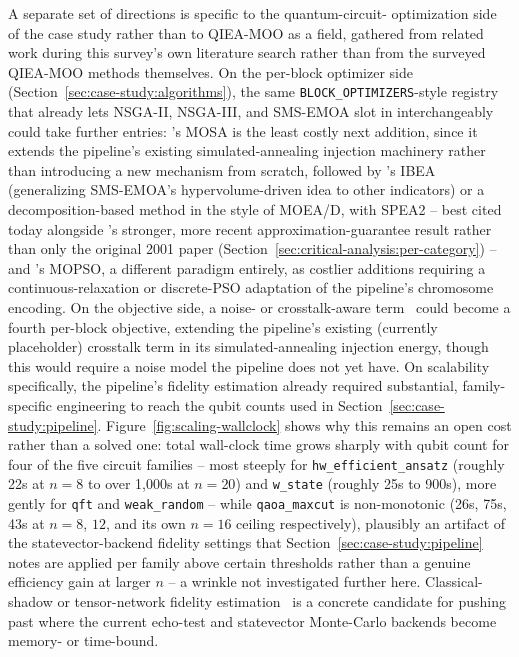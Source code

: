 A separate set of directions is specific to the quantum-circuit-
optimization side of the case study rather than to QIEA-MOO as a
field, gathered from related work during this survey's own literature
search rather than from the surveyed QIEA-MOO methods themselves.
On the per-block optimizer side
(Section~\ref{sec:case-study:algorithms}), the same
\texttt{BLOCK\_OPTIMIZERS}-style registry that already lets NSGA-II,
NSGA-III, and SMS-EMOA slot in interchangeably could take further
entries: \citet{ulungu1999mosa}'s MOSA is the least costly next
addition, since it extends the pipeline's existing simulated-annealing
injection machinery rather than introducing a new mechanism from
scratch, followed by \citet{zitzler2004ibea}'s IBEA (generalizing
SMS-EMOA's hypervolume-driven idea to other indicators) or a
decomposition-based method in the style of MOEA/D, with SPEA2 -- best
cited today alongside \citet{alghouass2025spea2beatsnsga2}'s stronger,
more recent approximation-guarantee result rather than only the
original 2001 paper (Section~\ref{sec:critical-analysis:per-category})
-- and \citet{coello2002mopso}'s MOPSO, a different paradigm entirely,
as costlier additions requiring a continuous-relaxation or discrete-PSO
adaptation of the pipeline's chromosome encoding. On the objective
side, a noise- or crosstalk-aware term~\citep{hua2022crosstalk} could
become a fourth per-block objective, extending the pipeline's existing
(currently placeholder) crosstalk term in its simulated-annealing
injection energy, though this would require a noise model the pipeline
does not yet have. On scalability specifically, the pipeline's fidelity
estimation already required substantial, family-specific engineering to
reach the qubit counts used in Section~\ref{sec:case-study:pipeline}.
Figure~\ref{fig:scaling-wallclock} shows why this remains an open cost
rather than a solved one: total wall-clock time grows sharply with
qubit count for four of the five circuit families -- most steeply for
\texttt{hw\_efficient\_ansatz} (roughly 22s at $n{=}8$ to over 1{,}000s
at $n{=}20$) and \texttt{w\_state} (roughly 25s to 900s), more gently
for \texttt{qft} and \texttt{weak\_random} --
while \texttt{qaoa\_maxcut} is non-monotonic (26s, 75s, 43s at $n{=}8$,
$12$, and its own $n{=}16$ ceiling respectively), plausibly an artifact
of the statevector-backend fidelity settings that
Section~\ref{sec:case-study:pipeline} notes are applied per family
above certain thresholds rather than a genuine efficiency gain at
larger $n$ -- a wrinkle not investigated further here.
Classical-shadow or tensor-network fidelity
estimation~\citep{akhtar2023shadow} is a concrete candidate for pushing
past where the current echo-test and statevector Monte-Carlo backends
become memory- or time-bound.

